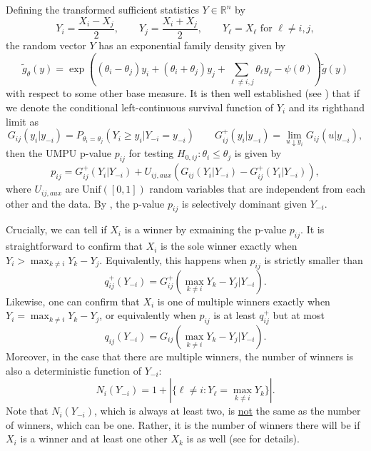 \documentclass{article}
\newcommand{\R}{\mathbb{R}}
\begin{document}
Defining the transformed sufficient statistics $Y \in \R^n$ by
\begin{equation}
    \label{eq:reparam}
    Y_i = \frac{X_i - X_j}{2}, \qquad  Y_j = \frac{X_i + X_j}{2}, \qquad  Y_{\ell} = X_{\ell} \text{ for } \ell \neq i, j,
\end{equation}
the random vector $Y$ has an exponential family density given by
\begin{equation}
    \tilde{g}_{\theta}(y) = \exp\left( (\theta_i - \theta_j) y_i + (\theta_i + \theta_j) y_j + \sum_{\ell \neq i, j} \theta_{\ell} y_{\ell} - \psi(\theta)  \right)\tilde{g}(y)
\end{equation}
with respect to some other base measure. It is then well established (see ) that if we denote the conditional left-continuous survival function of $Y_i$ and its righthand limit as
\begin{equation}
    G_{ij}(y_i | y_{-i}) = P_{\theta_i = \theta_j}(Y_i \geq y_i | Y_{-i} = y_{-i}) \qquad G_{ij}^+(y_i |y_{-i}) = \lim_{u \downarrow y_i } G_{ij}(u | y_{-i}),
\end{equation}
then the UMPU p-value $p_{ij}$ for testing $H_{0, ij}: \theta_i \leq \theta_j$ is given by 
\begin{equation}
    \label{eq:umpu_rank_verification}
    p_{ij} = G^+_{ij}(Y_i | Y_{-i}) + U_{ij, aux}(G_{ij}(Y_{i}|Y_{-i}) - G^+_{ij}(Y_i|Y_{-i})),
\end{equation}
where $U_{ij, aux}$ are $\text{Unif}([0, 1])$ random variables that are independent from each other and the data. By , the p-value $p_{ij}$ is selectively dominant given $Y_{-i}$. 

Crucially, we can tell if $X_i$ is a winner by exmaining the p-value $p_{ij}$. It is straightforward to confirm that $X_i$ is the sole winner exactly when $Y_i > \max_{k \neq i } Y_k - Y_j $. Equivalently, this happens when $p_{ij}$ is strictly smaller than 
\begin{equation}
    \label{eq:rank_verification_lower}
    q^+_{ij}(Y_{-i}) = G^+_{ij}(\max_{k \neq i} Y_k - Y_j | Y_{-i}).
\end{equation}
Likewise, one can confirm that $X_i$ is one of multiple winners exactly when $Y_i = \max_{k \neq i } Y_k - Y_j$, or equivalently when $p_{ij}$ is at least $q^+_{ij}$ but at most 
\begin{equation}
    \label{eq:rank_verification_upper}
    q_{ij}(Y_{-i}) = G_{ij}(\max_{k \neq i} Y_k - Y_j | Y_{-i}).
\end{equation}
Moreover, in the case that there are multiple winners, the number of winners is also a deterministic function of $Y_{-i}$:
\begin{equation}
    \label{eq:rank_verification_num_ties}
    N_{i}(Y_{-i}) = 1 + | \{ \ell \neq i : Y_{\ell} = \max_{k \neq i} Y_k  \} |.
\end{equation}
Note that $N_{i}(Y_{-i})$, which is always at least two, is \underline{not} the same as the number of winners, which can be one. Rather, it is the number of winners there will be if $X_i$ is a winner and at least one other $X_k$ is as well (see  for details).  
\end{document}
